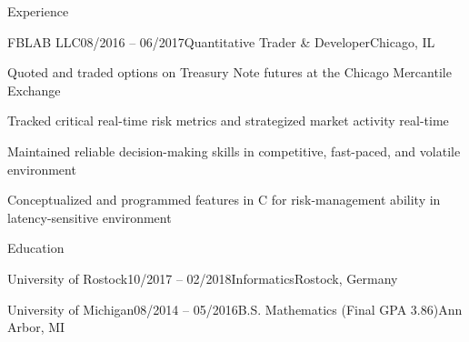 \documentclass{resume}
\begin{document}
\begin{cvSection}{Experience}
        \begin{cvSubsection}{FBLAB LLC}{08/2016 -- 06/2017}{Quantitative Trader \& Developer}{Chicago, IL}
            \item Quoted and traded options on Treasury Note futures at the Chicago Mercantile Exchange
            \item Tracked critical real-time risk metrics and strategized market activity real-time
            \item Maintained reliable decision-making skills in competitive, fast-paced, and volatile environment
            \item Conceptualized and programmed features in C for risk-management ability in latency-sensitive environment
        \end{cvSubsection}

    \end{cvSection}

    \begin{cvSection}{Education}

        \begin{cvSubsection}{University of Rostock}{10/2017 -- 02/2018}{Informatics}{Rostock, Germany}
        \end{cvSubsection}

        \begin{cvSubsection}{University of Michigan}{08/2014 -- 05/2016}{B.S. Mathematics (Final GPA 3.86)}{Ann Arbor, MI}
        \end{cvSubsection}

    \end {cvSection}
\end{document}
